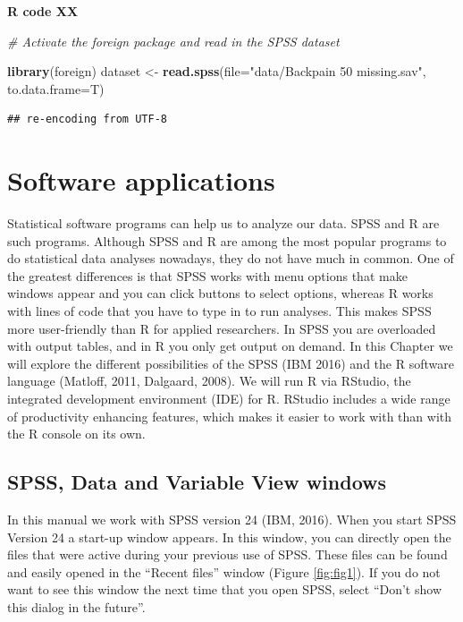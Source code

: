 \documentclass[]{book}
\newenvironment{Shaded}{\begin{snugshade}}{\end{snugshade}}
\newcommand{\KeywordTok}[1]{\textcolor[rgb]{0.13,0.29,0.53}{\textbf{#1}}}
\newcommand{\DataTypeTok}[1]{\textcolor[rgb]{0.13,0.29,0.53}{#1}}
\newcommand{\StringTok}[1]{\textcolor[rgb]{0.31,0.60,0.02}{#1}}
\newcommand{\CommentTok}[1]{\textcolor[rgb]{0.56,0.35,0.01}{\textit{#1}}}
\newcommand{\NormalTok}[1]{#1}
\begin{document}
\textbf{R code XX}

\begin{Shaded}
\begin{Highlighting}[]
\CommentTok{# Activate the foreign package and read in the SPSS dataset}

\KeywordTok{library}\NormalTok{(foreign)}
\NormalTok{dataset <-}\StringTok{ }\KeywordTok{read.spss}\NormalTok{(}\DataTypeTok{file=}\StringTok{"data/Backpain 50 missing.sav"}\NormalTok{, }\DataTypeTok{to.data.frame=}\NormalTok{T)}
\end{Highlighting}
\end{Shaded}

\begin{verbatim}
## re-encoding from UTF-8
\end{verbatim}

\chapter{Software applications}\label{software-applications}

Statistical software programs can help us to analyze our data. SPSS and
R are such programs. Although SPSS and R are among the most popular
programs to do statistical data analyses nowadays, they do not have much
in common. One of the greatest differences is that SPSS works with menu
options that make windows appear and you can click buttons to select
options, whereas R works with lines of code that you have to type in to
run analyses. This makes SPSS more user-friendly than R for applied
researchers. In SPSS you are overloaded with output tables, and in R you
only get output on demand. In this Chapter we will explore the different
possibilities of the SPSS (IBM 2016) and the R software language
(Matloff, 2011, Dalgaard, 2008). We will run R via RStudio, the
integrated development environment (IDE) for R. RStudio includes a wide
range of productivity enhancing features, which makes it easier to work
with than with the R console on its own.

\section{SPSS, Data and Variable View
windows}\label{spss-data-and-variable-view-windows}

In this manual we work with SPSS version 24 (IBM, 2016). When you start
SPSS Version 24 a start-up window appears. In this window, you can
directly open the files that were active during your previous use of
SPSS. These files can be found and easily opened in the ``Recent files''
window (Figure \ref{fig:fig1}). If you do not want to see this window
the next time that you open SPSS, select ``Don't show this dialog in the
future''.
\end{document}
